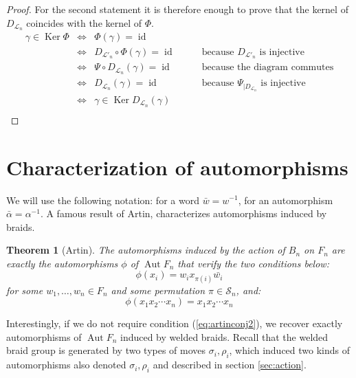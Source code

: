 \documentclass[11pt]{amsart}
\newtheorem{theorem}{Theorem}
\begin{document}
\begin{proof}
\bigskip

For the second statement it is therefore enough to prove that the kernel of 
$D_{\mathcal{L}_n}$ coincides with  the kernel of $\Phi$.
$$
\begin{array}{rcll}
\gamma \in {\mathop{\mathrm{Ker}}\nolimits} \Phi 
& \iff & \Phi(\gamma)= {\mathop{\mathrm{id}}\nolimits} \\
& \iff & D_{\mathcal{L}'_n} \circ \Phi (\gamma) = {\mathop{\mathrm{id}}\nolimits} &\qquad \text{because $D_{\mathcal{L}'_n}$ is injective} \\
& \iff & \Psi \circ D_{\mathcal{L}_n}(\gamma) = {\mathop{\mathrm{id}}\nolimits} &\qquad \text{because the diagram commutes} \\
& \iff & D_{\mathcal{L}_n}(\gamma) = {\mathop{\mathrm{id}}\nolimits} &\qquad \text{because $\Psi_{| D_{\mathcal{L}_n}}$  is injective}\\
& \iff & \gamma \in {\mathop{\mathrm{Ker}}\nolimits}  D_{\mathcal{L}_n}(\gamma)&\\
\end{array}
$$

\end{proof}

\section{Characterization of automorphisms}
\label{sec:auto}

We will use the following notation: for a word ${\bar{{w}}}= w^{-1}$, 
for an automorphism ${\bar{{\alpha}}}=\alpha^{-1}$.
A famous result of Artin, characterizes automorphisms induced by braids.
\begin{theorem}[Artin]
The automorphisms induced by the action of $B_n$ on $F_n$ are exactly 
the automorphisms $\phi$ of ${\mathop{\mathrm{Aut}}\nolimits} F_n$ that verify the two conditions below:
\begin{equation}
\label{eq:artinconj1}
\phi(x_i)=w_i x_{\pi(i)} {\bar{{w_i}}}  
\end{equation}
for some $w_1,\ldots,w_n \in F_n$ and some permutation $\pi \in \mathcal{S}_n$, and:
\begin{equation}
\label{eq:artinconj2}
\phi(x_1x_2\cdots x_n) = x_1x_2\cdots x_n
\end{equation}
\end{theorem}

\bigskip

Interestingly, if we do not require condition (\ref{eq:artinconj2}), we recover 
exactly automorphisms of ${\mathop{\mathrm{Aut}}\nolimits} F_n$ induced by welded braids. Recall 
that the welded braid group is generated by two types of moves $\sigma_i, \rho_i$, which induced 
two kinds of automorphisms also denoted $\sigma_i, \rho_i$ and described in section \ref{sec:action}.
\end{document}
